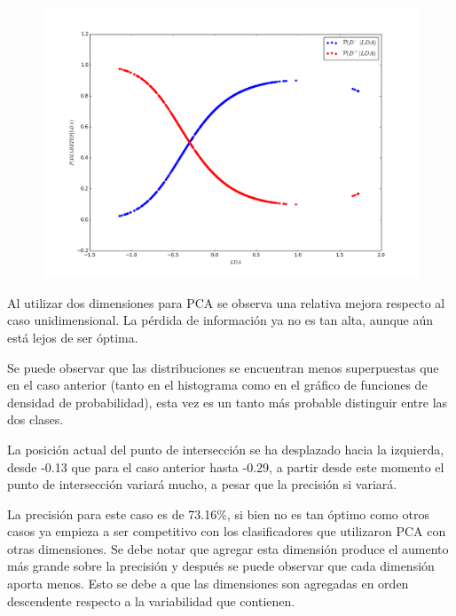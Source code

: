 \documentclass[letter, titlepage, 10pt]{article}
\begin{document}
\begin{figure}[H]
\begin{minipage}{.5\textwidth}
    \end{minipage}
    \begin{minipage}{.5\textwidth}
        \centering
        \includegraphics[width=1\linewidth]{images/CP_D2}
    \end{minipage}
\end{figure}
Al utilizar dos dimensiones para PCA se observa una relativa mejora respecto al caso unidimensional. La pérdida de información ya no es tan alta, aunque aún está lejos de ser óptima.

Se puede observar que las distribuciones se encuentran menos superpuestas que en el caso anterior (tanto en el histograma como en el gráfico de funciones de densidad de probabilidad), esta vez es un tanto más probable distinguir entre las dos clases.

La posición actual del punto de intersección se ha desplazado hacia la izquierda, desde -0.13 que para el caso anterior hasta -0.29, a partir desde este momento el punto de intersección variará mucho, a pesar que la precisión si variará. 

La precisión para este caso es de 73.16\%, si bien no es tan óptimo como otros casos ya empieza a ser competitivo con los clasificadores que utilizaron PCA con otras dimensiones. Se debe notar que agregar esta dimensión produce el aumento más grande sobre la precisión y después se puede observar que cada dimensión aporta menos. Esto se debe a que las dimensiones son agregadas en orden descendente respecto a la variabilidad que contienen.

\newpage
\end{document}
